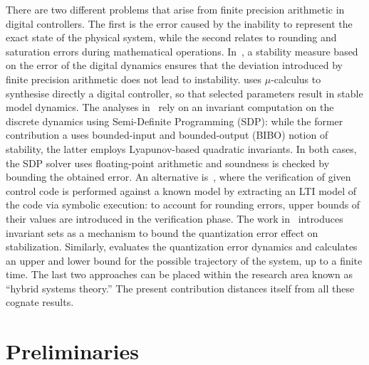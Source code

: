 There are two different problems that arise from finite precision arithmetic in digital controllers.  
The first is the error caused by the inability to represent the exact state of the physical system, 
while the second relates to rounding and saturation errors during mathematical operations.  
In~\cite{fialho1994stability}, a stability measure based on the error of the digital dynamics ensures that
the deviation introduced by finite precision arithmetic does not lead to instability.  
\cite{DBLP:journals/automatica/WuLCC09} uses $\mu$-calculus to synthesise directly a digital controller, 
so that selected parameters result in stable model dynamics.  
The analyses in~\cite{DBLP:conf/hybrid/RouxJG15, DBLP:conf/hybrid/WangGRJF16} rely on an
invariant computation on the discrete dynamics using Semi-Definite
Programming (SDP):  while the former contribution a uses bounded-input and bounded-output
(BIBO) notion of stability, the latter employs Lyapunov-based
quadratic invariants.  In both cases, the SDP solver uses floating-point
arithmetic and soundness is checked by bounding the obtained error.  
An alternative is~\cite{park2016scalable}, where the verification of given control code is
performed against a known model by extracting an LTI model of the code via 
symbolic execution: to account for rounding errors, upper bounds of their values are 
introduced in the verification phase.  
The work in~\cite{picasso2003stabilization} introduces invariant sets as a mechanism to
bound the quantization error effect on stabilization.  
Similarly, 
\cite{liberzon2003hybrid} evaluates the quantization error dynamics and calculates an upper and lower
bound for the possible trajectory of the system, up to a finite time. 
The last two approaches can be placed within the research area known as ``hybrid systems theory.''  
The present contribution distances itself from all these cognate results. 

\section{Preliminaries}
\label{sec:model}


